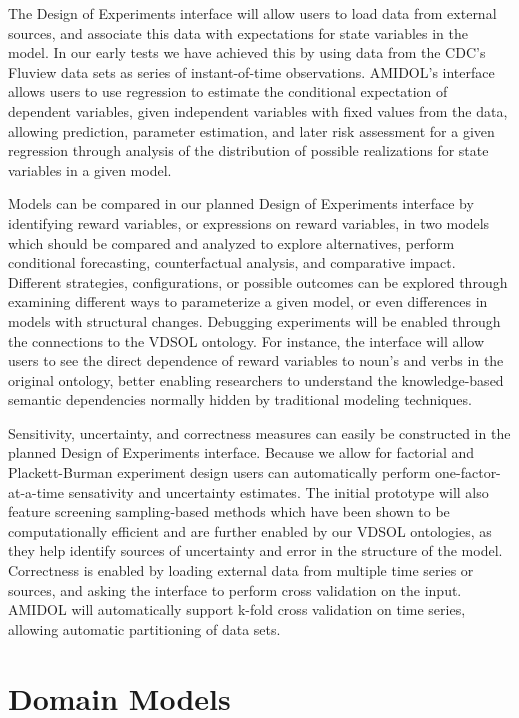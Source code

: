 \documentclass[11pt]{article}
\newcommand{\amidol}{\textsc{AMIDOL}}
\begin{document}
The Design of Experiments interface will allow users to load data from external sources, and associate this data with expectations for state variables in the model.  In our early tests we have achieved this by using data from the CDC's Fluview \cite{cdc2019fluview} data sets as series of instant-of-time observations.  \amidol{}'s interface allows users to use regression to estimate the conditional expectation of dependent variables, given independent variables with fixed values from the data, allowing prediction, parameter estimation, and later risk assessment for a given regression through analysis of the distribution of possible realizations for state variables in a given model.

Models can be compared in our planned Design of Experiments interface by identifying reward variables, or expressions on reward variables, in two models which should be compared and analyzed to explore alternatives, perform conditional forecasting, counterfactual analysis, and comparative impact.  Different strategies, configurations, or possible outcomes can be explored through examining different ways to parameterize a given model, or even differences in models with structural changes.  Debugging experiments will be enabled through the connections to the VDSOL ontology.  For instance, the interface will allow users to see the direct dependence of reward variables to noun's and verbs in the original ontology, better enabling researchers to understand the knowledge-based semantic dependencies normally hidden by traditional modeling techniques.

Sensitivity, uncertainty, and correctness measures can easily be constructed in the planned Design of Experiments interface.  Because we allow for factorial and Plackett-Burman experiment design users can automatically perform one-factor-at-a-time \cite{bailis2005mortality,murphy2004quantification} sensativity and uncertainty estimates.  The initial prototype will also feature screening sampling-based methods \cite{morris1991factorial} which have been shown to be computationally efficient and are further enabled by our VDSOL ontologies, as they help identify sources of uncertainty and error in the structure of the model.  Correctness is enabled by loading external data from multiple time series or sources, and asking the interface to perform cross validation on the input.  \amidol{} will automatically support k-fold cross validation on time series, allowing automatic partitioning of data sets.

\section{Domain Models}
\end{document}
